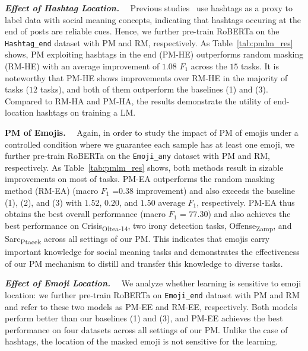 \noindent\textit{\textbf{Effect of Hashtag Location.}}~~ Previous studies~\cite{ren2016context, abdul-2017-emonet} use hashtags as a proxy to label data with social meaning concepts, indicating that hashtags occuring at the end of posts are reliable cues. Hence, we further pre-train RoBERTa on the \texttt{Hashtag\_end} dataset with PM and RM, respectively. As Table~\ref{tab:pmlm_res} shows, PM exploiting hashtags in the end (PM-HE) outperforms random masking (RM-HE) with an average improvement of $1.08$ $F_1$ across the $15$ tasks. It is noteworthy that PM-HE shows improvements over RM-HE in the majority of tasks ($12$ tasks), and both of them outperform the baselines (1) and (3). Compared to RM-HA and PM-HA, the results demonstrate the utility of end-location hashtags on training a LM.


\noindent \textbf{PM of Emojis.}~~ Again, in order to study the impact of PM of emojis under a controlled condition where we guarantee each sample has at least one emoji, we further pre-train RoBERTa on the \texttt{Emoji\_any} dataset with PM and RM, respectively. As Table~\ref{tab:pmlm_res} shows, both methods result in sizable improvements on most of tasks. PM-EA outperforms the random masking method (RM-EA) (macro $F_1$ =$0.38$ improvement) and also exceeds the baseline (1), (2), and (3) with $1.52$, $0.20$, and $1.50$ average $F_1$, respectively. PM-EA thus obtains the best overall performance (macro $F_1$ = $77.30$) and also achieves the best performance on Crisis\textsubscript{Oltea-14}, two irony detection tasks, Offense\textsubscript{Zamp}, and Sarc\textsubscript{Ptacek} across all settings of our PM. 
This indicates that emojis carry important knowledge for social meaning tasks and demonstrates the effectiveness of our PM mechanism to distill and transfer this knowledge to diverse tasks. %

\noindent \textit{\textbf{Effect of Emoji Location.}}~~ We analyze whether learning is sensitive to emoji location: we further pre-train RoBERTa on \texttt{Emoji\_end} dataset with PM and RM and refer to these two models as PM-EE and RM-EE, respectively. Both models perform better than our baselines (1) and (3), and PM-EE achieves the best performance on four datasets across all settings of our PM. Unlike the case of hashtags, the location of the masked emoji is not sensitive for the learning.  

